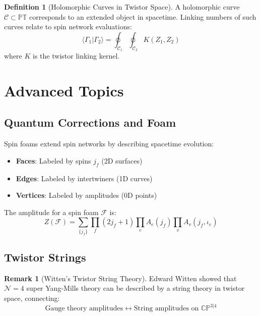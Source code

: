 \documentclass[12pt,a4paper]{article}
\theoremstyle{definition}
\newtheorem{definition}{Definition}[section]
\newtheorem{remark}{Remark}[section]
\newcommand{\CP}{\mathbb{CP}}
\begin{document}
\begin{definition}[Holomorphic Curves in Twistor Space]
A holomorphic curve $\mathcal{C} \subset \mathbb{PT}$ corresponds to an extended object in spacetime. Linking numbers of such curves relate to spin network evaluations:
\begin{equation}
\langle \Gamma_1 | \Gamma_2 \rangle = \oint_{\mathcal{C}_1} \oint_{\mathcal{C}_2} K(Z_1, Z_2)
\end{equation}
where $K$ is the twistor linking kernel.
\end{definition}

\section{Advanced Topics}

\subsection{Quantum Corrections and Foam}

\begin{tcolorbox}[colback=tealblue!5,colframe=tealblue,title=Spin Foam Models]
Spin foams extend spin networks by describing spacetime evolution:
\begin{itemize}
    \item \textbf{Faces}: Labeled by spins $j_f$ (2D surfaces)
    \item \textbf{Edges}: Labeled by intertwiners (1D curves)
    \item \textbf{Vertices}: Labeled by amplitudes (0D points)
\end{itemize}

The amplitude for a spin foam $\mathcal{F}$ is:
\begin{equation}
Z(\mathcal{F}) = \sum_{\{j_f\}} \prod_{f} (2j_f+1) \prod_{e} A_e(j_f) \prod_{v} A_v(j_f, \iota_e)
\end{equation}
\end{tcolorbox}

\subsection{Twistor Strings}

\begin{remark}[Witten's Twistor String Theory]
Edward Witten showed that $\mathcal{N}=4$ super Yang-Mills theory can be described by a string theory in twistor space, connecting:
\begin{equation}
\text{Gauge theory amplitudes} \longleftrightarrow \text{String amplitudes on } \CP^{3|4}
\end{equation}
\end{remark}
\end{document}
